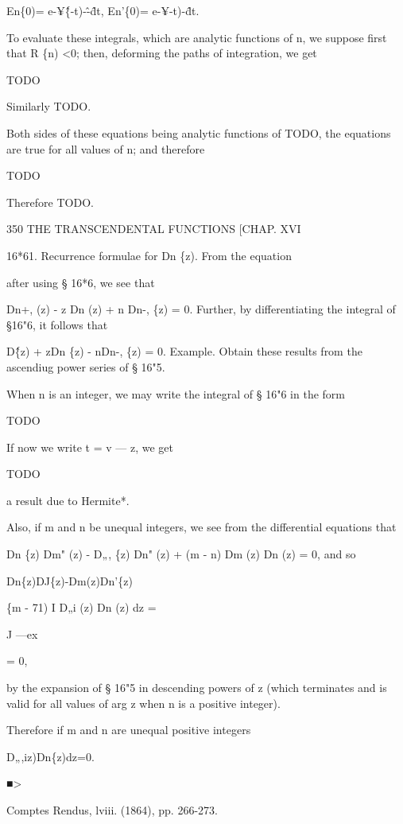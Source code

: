 En\{0)= e-¥\^\{-t)-\^-\^dt, En'\{0)= e-¥-t)-\^dt.

To evaluate these integrals, which are analytic functions of n, we
suppose first that R \{n) <0; then, deforming the paths of
integration, we get

TODO

Similarly TODO.

Both sides of these equations being analytic functions of TODO, the
equations are true for all values of n; and therefore

TODO

Therefore TODO.

350 THE TRANSCENDENTAL FUNCTIONS [CHAP. XVI

16*61. Recurrence formulae for Dn \{z). From the equation

after using § 16*6, we see that

Dn+, (z) - z Dn (z) + n Dn-, \{z) = 0. Further, by differentiating the
integral of §16"6, it follows that

D\^ \{z) + zDn \{z) - nDn-, \{z) = 0. Example. Obtain these results
from the ascendiug power series of § 16"5.


When n is an integer, we may write the integral of § 16"6 in the form

TODO

If now we write t = v — z, we get

TODO

a result due to Hermite*.

Also, if m and n be unequal integers, we see from the differential
equations that

Dn \{z) Dm" (z) - D„, \{z) Dn" (z) + (m - n) Dm (z) Dn (z) = 0, and so

Dn\{z)DJ\{z)-Dm(z)Dn'\{z)

\{m - 71) I D„i (z) Dn (z) dz =

J —ex

= 0,

by the expansion of § 16"5 in descending powers of z (which terminates
and is valid for all values of arg z when n is a positive integer).

Therefore if m and n are unequal positive integers

D„,iz)Dn\{z)dz=0.

■>

Comptes Rendus, lviii. (1864), pp. 266-273.

%
%


